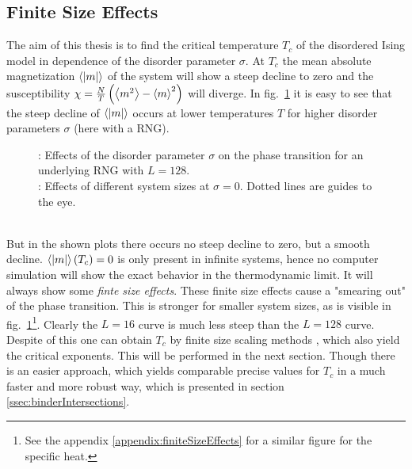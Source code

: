 \subsection{Finite Size Effects}
\label{ssec:finitesize}
    The aim of this thesis is to find the critical temperature \(T_c\)
    of the disordered Ising model in dependence of the disorder parameter
    \(\sigma\). At \(T_c\) the mean absolute magnetization \(\left< |m| \right>\) of
    the system will show a steep decline to zero and the susceptibility
    \(\chi = \frac{N}{T}\left(\left< m^2 \right>-\left< m \right>^2\right)\)
    will diverge. In fig.\ \ref{fig:smeared_out}
    it is easy to see that the steep decline of \(\left< |m| \right>\)
    occurs at lower temperatures \(T\) for higher
    disorder parameters \(\sigma\) (here with a RNG).
    \begin{figure}[htbp]
        \centering
        \caption[Phase Transition and Finite Size Effects]
        {
            : Effects of the disorder
            parameter $\sigma$ on the phase transition
            for an underlying RNG with $L=128$.\\
            : Effects of different system
            sizes at \(\sigma = 0\). Dotted lines are guides to the eye.
        }
        \label{fig:smeared_out}
    \end{figure}\\
    But in the shown plots there occurs no steep decline to zero, but a
    smooth decline. \(\left< \left\vert m\right\vert \right>(T_c) = 0\) is only present in infinite
    systems, hence no computer simulation will show the exact behavior in the
    thermodynamic limit. It will always show some \emph{finte size effects}.
    These finite size effects cause a "smearing out" of the phase
    transition. This is stronger for smaller system sizes, as is visible
    in fig.\ \ref{fig:smeared_out}\footnote{See the appendix \ref{appendix:finiteSizeEffects} for a similar figure for the specific heat.}.
    Clearly the \(L=16\) curve is much less steep than the \(L=128\) curve.\\
    Despite of this one can obtain \(T_c\) by finite size scaling
    methods \cite[p. 232ff]{NewmanBarkema1999}, which also yield the critical
    exponents. This will be performed in the next section.
    Though there is an easier approach, which yields comparable precise
    values for \(T_{c}\) in a much faster and more robust way, which is
    presented in section \ref{ssec:binderIntersections}.

